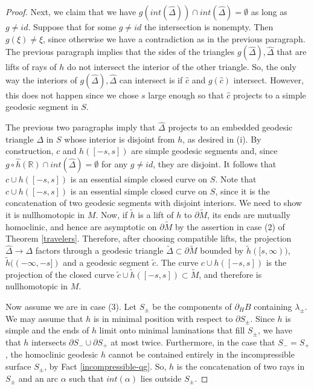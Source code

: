 \documentclass[12pt]{amsart}
\theoremstyle{definition}
\theoremstyle{remark}
\newcommand{\BR}{\mathbb R} \newcommand{\BD}{\mathbb D}
\begin{document}
\begin{proof}
Next, we claim that we have $g(int(\hat \Delta)) \cap int(\hat \Delta)=\emptyset$ as long as $g\neq id$. Suppose that for some $g\neq id$ the intersection is nonempty. Then  $g(\xi) \neq \xi$, since otherwise we have a contradiction as in the previous paragraph. The previous paragraph implies that the sides of the triangles $g(\hat \Delta) , \hat \Delta$ that are lifts of rays of $h$ do not intersect the interior of the other triangle. So, the only way the interiors of $g(\hat \Delta) , \hat \Delta$ can intersect is if $\hat c$ and $g(\hat c)$ intersect. However, this does not happen since we chose $s$ large enough so that $\hat c$ projects to a simple geodesic segment in $S$.

The previous two paragraphs imply that $\hat \Delta$ projects to an embedded geodesic triangle $\Delta$ in $S$ whose interior is disjoint from $h$, as desired in (i). By construction, $c$ and $h([-s,s])$ are simple geodesic segments and, since $g \circ \hat h(\BR) \cap int(\hat \Delta) = \emptyset$ for any $g\neq id$, they are disjoint. It follows that $c \cup h([-s,s])$ is an essential simple closed curve on $S$. Note that $c \cup h([-s,s])$ is an essential simple closed curve on $S$, since it is the concatenation of two geodesic segments with disjoint interiors. We need to show it is nullhomotopic in $M$. Now, if $\tilde h$ is a lift of $h$ to $\partial \tilde M$, its ends are mutually homoclinic, and hence are asymptotic on $\partial \tilde M$ by the assertion in case (2) of Theorem \ref{travelers}. Therefore, after choosing compatible lifts, the projection $\hat \Delta \longrightarrow
\Delta$ factors through a geodesic triangle $\tilde \Delta \subset \partial \tilde M$ bounded by $\tilde h([s,\infty))$, $\tilde h((-\infty,-s])$ and a geodesic segment $\tilde c$. The curve $c \cup h([-s,s])$ is the projection of the closed curve $\tilde c \cup \tilde h([-s,s]) \subset \tilde M$,  and therefore is nullhomotopic in $M$.

\medskip

Now assume we are in case (3). Let $S_\pm$ be the components of $\partial_H B$ containing $\lambda_\pm$. We may assume that $h$ is in minimal position with respect to $\partial S_\pm$. Since $h$ is simple and the ends of $h$ limit onto minimal laminations that fill $S_\pm$, we have that $h$  intersects $\partial S_- \cup \partial S_+$ at most twice. Furthermore, in the case that $S_-=S_+$, the homoclinic geodesic $h$ cannot be contained entirely in the incompressible surface $S_\pm$, by Fact \ref{incompressible-qg}. So, $h$ is the concatenation of two rays in $S_\pm$ and an arc $\alpha$ such that $int(\alpha)$ lies outside $S_\pm$. 


\end{proof}
\end{document}
